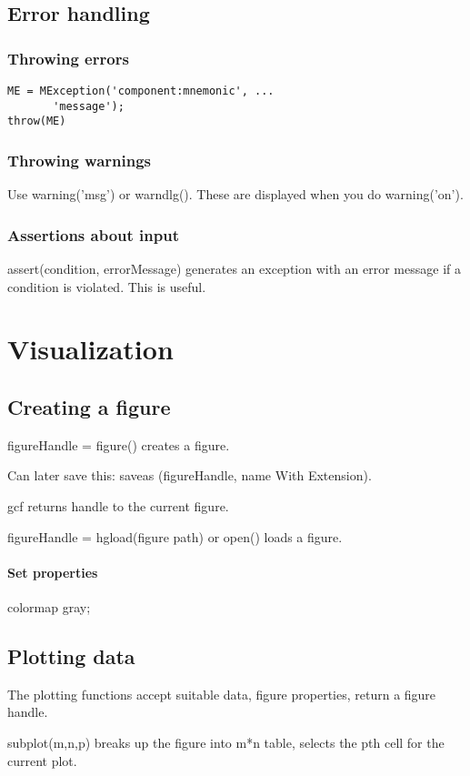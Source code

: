 \documentclass[oneside, article]{memoir}
\begin{document}
\subsection{Error handling}
\subsubsection{Throwing errors}
\begin{verbatim}
ME = MException('component:mnemonic', ...
       'message');
throw(ME)
\end{verbatim}


\subsubsection{Throwing warnings}
Use warning('msg') or warndlg(). These are displayed when you do warning('on').

\subsubsection{Assertions about input}
assert(condition, errorMessage) generates an exception with an error message if a condition is violated. This is useful.


\section{Visualization}
\subsection{Creating a figure}
figureHandle = figure() creates a figure.

Can later save this: saveas (figureHandle, name With Extension).

gcf returns handle to the current figure.

figureHandle = hgload(figure path) or open() loads a figure.

\paragraph*{Set properties}
colormap gray;


\subsection{Plotting data}
The plotting functions accept suitable data, figure properties, return a figure handle.

subplot(m,n,p) breaks up the figure into m*n table, selects the pth cell for the current plot.
\end{document}
